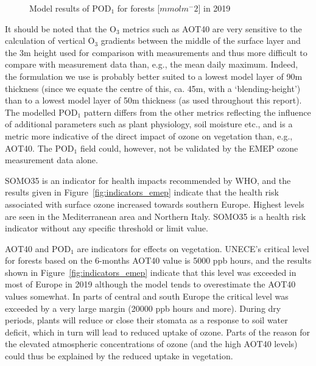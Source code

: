 \begin{figure}[H]
\caption{Model results of POD$_1$ for forests [$mmol m^-2$] in 2019}
\label{fig:indicatorPOD}
\end{figure}

It should be noted that the O$_3$ metrics such as AOT40 are very sensitive to the calculation of vertical O$_3$ gradients between the middle of the surface layer and the 3m height used for comparison with measurements \citep{Tuovinen:EP2007} and thus more difficult to compare with measurement data than, e.g., the mean daily maximum. Indeed, the formulation we use \citep{Simpson:EMEP2012} is probably better suited to a lowest model layer of 90m thickness (since we equate the centre of this, ca. 45m, with a `blending-height') than to a lowest model layer of 50m thickness (as used throughout this report). 
The modelled POD$_1$ pattern differs from the other metrics reflecting the influence of additional parameters such as plant physiology, soil moisture etc., and is a metric more indicative of the direct impact of ozone on vegetation than, e.g., AOT40. The POD$_1$ field could, however, not be validated by the EMEP ozone measurement data alone. 

SOMO35 is an indicator for health impacts recommended by WHO, and the results given in Figure~\ref{fig:indicators_emep} indicate that the health risk associated with surface ozone increased towards southern Europe. Highest levels are seen in the Mediterranean area and Northern Italy. SOMO35 is a health risk indicator without any specific threshold or limit value.

AOT40 and POD$_1$ are indicators for effects on vegetation. UNECE's critical level for forests based on the 6-months AOT40 value is 5000 ppb hours, and the results shown in Figure~\ref{fig:indicators_emep} indicate that this level was exceeded in most of Europe in 2019 although the model tends to overestimate the AOT40 values somewhat. In parts of central and south Europe the critical level was exceeded by a very large margin (20000 ppb hours and more). During dry periods, plants will reduce or close their stomata as a response to soil water deficit, which in turn will lead to reduced uptake of ozone.  Parts of the reason for the elevated atmospheric concentrations of ozone (and the high AOT40 levels) could thus be explained by the reduced uptake in vegetation.

